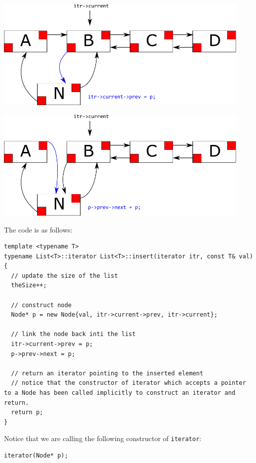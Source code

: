 \documentclass[11pt]{book}
\begin{document}
\begin{center}
\includegraphics[width=350pt]{./img/List-insert-2.pdf}
\end{center}

\begin{center}
\includegraphics[width=350pt]{./img/List-insert-3.pdf}
\end{center}

The code is as follows:
\begin{verbatim}
template <typename T>
typename List<T>::iterator List<T>::insert(iterator itr, const T& val) {
  // update the size of the list
  theSize++; 

  // construct node
  Node* p = new Node{val, itr->current->prev, itr->current};

  // link the node back inti the list
  itr->current->prev = p;
  p->prev->next = p;

  // return an iterator pointing to the inserted element
  // notice that the constructor of iterator which accepts a pointer to a Node has been called implicitly to construct an iterator and return.
  return p;
}
\end{verbatim}

Notice that we are calling the following constructor of \texttt{iterator}:
\begin{verbatim}
iterator(Node* p);
\end{verbatim}
\end{document}
